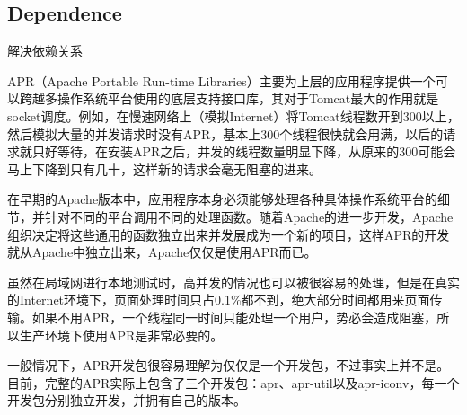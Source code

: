 \subsection{Dependence}


解决依赖关系

APR（Apache Portable Run-time Libraries）主要为上层的应用程序提供一个可以跨越多操作系统平台使用的底层支持接口库，其对于Tomcat最大的作用就是socket调度。例如，在慢速网络上（模拟Internet）将Tomcat线程数开到300以上，然后模拟大量的并发请求时没有APR，基本上300个线程很快就会用满，以后的请求就只好等待，在安装APR之后，并发的线程数量明显下降，从原来的300可能会马上下降到只有几十，这样新的请求会毫无阻塞的进来。

在早期的Apache版本中，应用程序本身必须能够处理各种具体操作系统平台的细节，并针对不同的平台调用不同的处理函数。随着Apache的进一步开发，Apache组织决定将这些通用的函数独立出来并发展成为一个新的项目，这样APR的开发就从Apache中独立出来，Apache仅仅是使用APR而已。

虽然在局域网进行本地测试时，高并发的情况也可以被很容易的处理，但是在真实的Internet环境下，页面处理时间只占0.1\%都不到，绝大部分时间都用来页面传输。如果不用APR，一个线程同一时间只能处理一个用户，势必会造成阻塞，所以生产环境下使用APR是非常必要的。

一般情况下，APR开发包很容易理解为仅仅是一个开发包，不过事实上并不是。目前，完整的APR实际上包含了三个开发包：apr、apr-util以及apr-iconv，每一个开发包分别独立开发，并拥有自己的版本。

